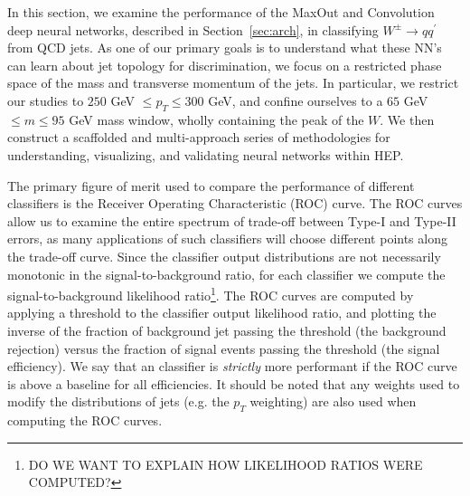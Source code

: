 
In this section, we examine the performance of the MaxOut and Convolution deep neural networks, described in Section~\ref{sec:arch}, in classifying $W^\pm \to q q^\prime$ from QCD jets.  As one of our primary goals is to understand  what these NN's can learn about jet topology for discrimination, we focus on a restricted phase space of the mass and transverse momentum of the jets.  In particular, we restrict our studies to $250$ GeV $\leq p_T \leq 300$ GeV, and confine ourselves to a $65$ GeV $\leq m \leq 95$ GeV mass window, wholly containing the peak of the $W$.   We then construct a scaffolded and multi-approach series of methodologies for understanding, visualizing, and validating neural networks within HEP.

The primary figure of merit used to compare the performance of different classifiers is the Receiver Operating Characteristic (ROC) curve.  The ROC curves allow us to examine the entire spectrum of trade-off between Type-I and Type-II errors, as many applications of such classifiers will choose different points along the trade-off curve.   Since the classifier output distributions are not necessarily monotonic in the signal-to-background ratio, for each classifier we compute the  signal-to-background likelihood ratio\footnote{DO WE WANT TO EXPLAIN HOW LIKELIHOOD RATIOS WERE COMPUTED?}.  The ROC curves are computed by applying a threshold to the classifier output likelihood ratio, and plotting the inverse of the fraction of background jet passing the threshold (the background rejection) versus the fraction of signal events passing the threshold (the signal efficiency).  We say that an classifier is \emph{strictly} more performant if the ROC curve is above a baseline for all efficiencies.  It should be noted that any weights used to modify the distributions of jets (e.g. the $p_{T}$ weighting) are also used when computing the ROC curves.

%

